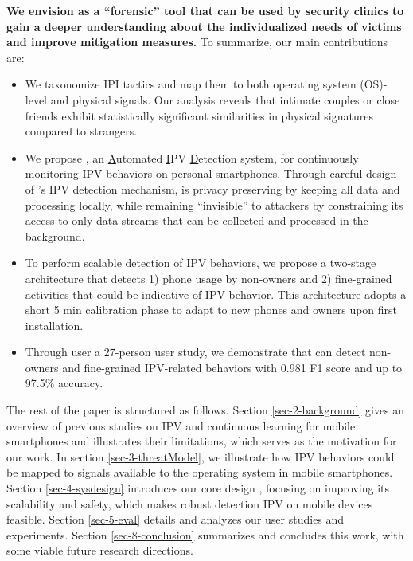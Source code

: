 \noindent
\textbf{We envision \sys as a ``forensic'' tool that can be used by security clinics to gain a deeper understanding about the individualized needs of victims and improve mitigation measures.} To summarize, our main contributions are:

\begin{itemize}[label=\raisebox{0.5ex}{\scalebox{1.2}{$\bullet$}}]
    \item We taxonomize IPI tactics and map them to both operating system (OS)-level and physical signals. Our analysis reveals that intimate couples or close friends exhibit statistically significant similarities in physical signatures compared to strangers.
    \item We propose \sys, an \underline{A}utomated \underline{I}PV \underline{D}etection system, for continuously monitoring IPV behaviors on personal smartphones. Through careful design of \sys's IPV detection mechanism, \sys is privacy preserving by keeping all data and processing locally, while remaining ``invisible'' to attackers by constraining its access to only data streams that can be collected and processed in the background. 
    
    \item To perform scalable detection of IPV behaviors, we propose a two-stage architecture that detects 1) phone usage by non-owners and 2) fine-grained activities that could be indicative of IPV behavior. This architecture adopts a short 5 min calibration phase to adapt to new phones and owners upon first installation.
        
    \item Through user a 27-person user study, we demonstrate that \sys can detect non-owners and fine-grained IPV-related behaviors with 0.981 F1 score and up to 97.5\% accuracy.
    
\end{itemize}


The rest of the paper is structured as follows. Section \ref{sec-2-background} gives an overview of previous studies on IPV and continuous learning for mobile smartphones and illustrates their limitations, which serves as the motivation for our work. In section \ref{sec-3-threatModel}, we illustrate how IPV behaviors could be mapped to signals available to the operating system in mobile smartphones. Section \ref{sec-4-sysdesign} introduces our core design \sys, focusing on improving its scalability and safety, which makes robust detection IPV on mobile devices feasible. Section \ref{sec-5-eval} details and analyzes our user studies and experiments.  Section \ref{sec-8-conclusion} summarizes and concludes this work, with some viable future research directions.




